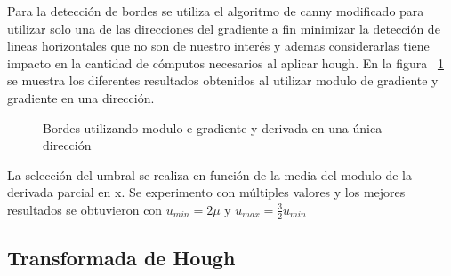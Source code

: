 \documentclass[a4paper,spanish]{article}
\begin{document}
Para la detección de bordes se utiliza el algoritmo de canny modificado para utilizar solo una de las direcciones del gradiente a fin minimizar la detección de lineas horizontales que no son de nuestro interés y ademas considerarlas tiene impacto en la cantidad de cómputos necesarios al aplicar hough. En la figura ~\ref{fig:bordes} se muestra los diferentes resultados obtenidos al utilizar modulo de gradiente y gradiente en una dirección.


\begin{figure}[H]
\caption{Bordes utilizando modulo e gradiente y derivada en una única dirección}
\label{fig:bordes}
\end{figure}

La selección del umbral se realiza en función de la media del modulo de la derivada parcial en x. Se experimento con múltiples valores y  los mejores resultados se obtuvieron con $u_{min} = 2 \mu$ y $ u_{max} = \frac{3}{2} u_{min}$

\subsection{Transformada de Hough} \label{sec:hough}
\end{document}
